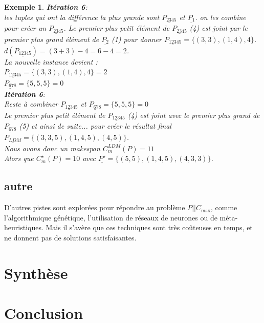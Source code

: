 \documentclass[a4paper,12pt]{report}
\theoremstyle{plain}				%
\newtheorem{example}{Exemple}
\theoremstyle{definition}				%
\newcommand\problemGrahamP{$P||C_{\max}$\xspace}
\begin{document}
\begin{itemize}
\begin{example}
\textbf{Itération 6}:\\
les tuples qui ont la différence la plus grande sont 
$\underline{P_{2345}}$  et $\underline{P_{1}}$. 
on les combine pour créer un $\underline{P_{2345}}$. Le premier plus petit élément de $\underline{P_{2345}}$ (4) est joint par le premier plus grand élément de $\underline{P_{2}}$ (1) pour donner  $\underline{P_{12345}} = \{(3,3),(1,4),4\}$.  
$d(\underline{P_{12345}}) = (3+3)-4 = 6-4=2$.\\
La nouvelle instance devient :\\
$\underline{P_{12345}} = \{(3,3),(1,4),4\}=2$\\
$\underline{P_{678}} = \{5,5,5\}=0$\\

\textbf{Itération 6}:\\
Reste à combiner $\underline{P_{12345}}$ et $\underline{P_{678}} = \{5,5,5\}=0$\\
Le premier plus petit élément de $\underline{P_{12345}}$ (4) est joint avec le premier plus grand de  $\underline{P_{678}}$ (5) et ainsi de suite... pour créer le résultat final \\
$\underline{P_{LDM}}= \{(3,3,5),(1,4,5),(4,5)\}$.\\
 
Nous avons donc un makespan $C_m^{LDM}(P) = 11 $ \\
Alors que $C_m^{\star}(P) = 10$ avec $\underline{P^{\star}}= \{(5,5),(1,4,5),(4,3,3)\}$.
\end{example}

\end{itemize}
 
\subsection{autre}
D'autres pistes sont explorées pour répondre au problème \problemGrahamP, comme l'algorithmique génétique, l'utilisation de réseaux de neurones ou de méta-heuristiques. Mais il s'avère que ces techniques sont très coûteuses en temps, et ne donnent pas de solutions satisfaisantes. 




\section{Synthèse}

\section{Conclusion}









\medskip


\end{document}
